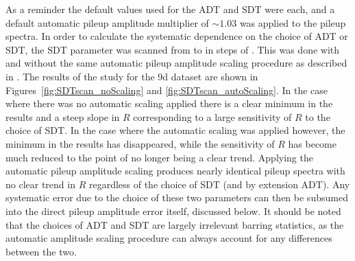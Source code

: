 As a reminder the default values used for the ADT and SDT were  each, and a default automatic pileup amplitude multiplier of $\sim1.03$ was applied to the pileup spectra. In order to calculate the systematic dependence on the choice of ADT or SDT, the SDT parameter was scanned from  to  in steps of . This was done with and without the same automatic pileup amplitude scaling procedure as described in . The results of the study for the 9d dataset are shown in Figures~\ref{fig:SDTscan_noScaling} and \ref{fig:SDTscan_autoScaling}. In the case where there was no automatic scaling applied there is a clear minimum in the \chisq results and a steep slope in $R$ corresponding to a large sensitivity of $R$ to the choice of SDT. In the case where the automatic scaling was applied however, the minimum in the \chisq results has disappeared, while the sensitivity of $R$ has become much reduced to the point of no longer being a clear trend. Applying the automatic pileup amplitude scaling produces nearly identical pileup spectra with no clear trend in $R$ regardless of the choice of SDT (and by extension ADT). Any systematic error due to the choice of these two parameters can then be subsumed into the direct pileup amplitude error itself, discussed below. It should be noted that the choices of ADT and SDT are largely irrelevant barring statistics, as the automatic amplitude scaling procedure can always account for any differences between the two. 


